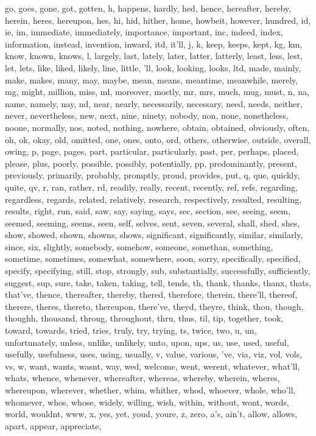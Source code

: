 \documentclass[a4paper, 12pt, twoside]{article}
\numberwithin{equation}{section} %
\begin{document}
{{\begin{appendices}
\begin{spverbatim}
 go,  goes,  gone,  got,  gotten,  h,  happens,  hardly,  hed,  hence,  hereafter,  hereby,  herein,  heres,  hereupon,  hes,  hi,  hid,  hither,  home,  howbeit,  however,  hundred,  id,  ie,  im,  immediate,  immediately,  importance,  important,  inc,  indeed,  index,  information,  instead,  invention,  inward,  itd,  it'll,  j,  k,  keep,  keeps,  kept,  kg,  km,  know,  known,  knows,  l,  largely,  last,  lately,  later,  latter,  latterly,  least,  less,  lest,  let,  lets,  like,  liked,  likely,  line,  little,  'll,  look,  looking,  looks,  ltd,  made,  mainly,  make,  makes,  many,  may,  maybe,  mean,  means,  meantime,  meanwhile,  merely,  mg,  might,  million,  miss,  ml,  moreover,  mostly,  mr,  mrs,  much,  mug,  must,  n,  na,  name,  namely,  nay,  nd,  near,  nearly,  necessarily,  necessary,  need,  needs,  neither,  never,  nevertheless,  new,  next,  nine,  ninety,  nobody,  non,  none,  nonetheless,  noone,  normally,  nos,  noted,  nothing,  nowhere,  obtain,  obtained,  obviously,  often,  oh,  ok,  okay,  old,  omitted,  one,  ones,  onto,  ord,  others,  otherwise,  outside,  overall,  owing,  p,  page,  pages,  part,  particular,  particularly,  past,  per,  perhaps,  placed,  please,  plus,  poorly,  possible,  possibly,  potentially,  pp,  predominantly,  present,  previously,  primarily,  probably,  promptly,  proud,  provides,  put,  q,  que,  quickly,  quite,  qv,  r,  ran,  rather,  rd,  readily,  really,  recent,  recently,  ref,  refs,  regarding,  regardless,  regards,  related,  relatively,  research,  respectively,  resulted,  resulting,  results,  right,  run,  said,  saw,  say,  saying,  says,  sec,  section,  see,  seeing,  seem,  seemed,  seeming,  seems,  seen,  self,  selves,  sent,  seven,  several,  shall,  shed,  shes,  show,  showed,  shown,  showns,  shows,  significant,  significantly,  similar,  similarly,  since,  six,  slightly,  somebody,  somehow,  someone,  somethan,  something,  sometime,  sometimes,  somewhat,  somewhere,  soon,  sorry,  specifically,  specified,  specify,  specifying,  still,  stop,  strongly,  sub,  substantially,  successfully,  sufficiently,  suggest,  sup,  sure,  take,  taken,  taking,  tell,  tends,  th,  thank,  thanks,  thanx,  thats,  that've,  thence,  thereafter,  thereby,  thered,  therefore,  therein,  there'll,  thereof,  therere,  theres,  thereto,  thereupon,  there've,  theyd,  theyre,  think,  thou,  though,  thoughh,  thousand,  throug,  throughout,  thru,  thus,  til,  tip,  together,  took,  toward,  towards,  tried,  tries,  truly,  try,  trying,  ts,  twice,  two,  u,  un,  unfortunately,  unless,  unlike,  unlikely,  unto,  upon,  ups,  us,  use,  used,  useful,  usefully,  usefulness,  uses,  using,  usually,  v,  value,  various,  've,  via,  viz,  vol,  vols,  vs,  w,  want,  wants,  wasnt,  way,  wed,  welcome,  went,  werent,  whatever,  what'll,  whats,  whence,  whenever,  whereafter,  whereas,  whereby,  wherein,  wheres,  whereupon,  wherever,  whether,  whim,  whither,  whod,  whoever,  whole,  who'll,  whomever,  whos,  whose,  widely,  willing,  wish,  within,  without,  wont,  words,  world,  wouldnt,  www,  x,  yes,  yet,  youd,  youre,  z,  zero,  a's,  ain't,  allow,  allows,  apart,  appear,  appreciate,  
\end{spverbatim}
\end{appendices}}}
\end{document}
